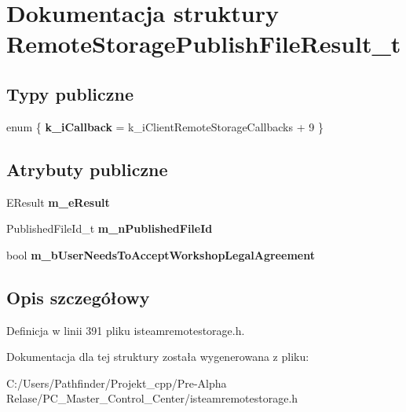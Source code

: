 \hypertarget{struct_remote_storage_publish_file_result__t}{}\section{Dokumentacja struktury Remote\+Storage\+Publish\+File\+Result\+\_\+t}
\label{struct_remote_storage_publish_file_result__t}
\subsection*{Typy publiczne}
\begin{DoxyCompactItemize}
\item 
\mbox{\label{struct_remote_storage_publish_file_result__t_abed55568a305e9a891c09f5b1ff54334}} 
enum \{ {\bfseries k\+\_\+i\+Callback} = k\+\_\+i\+Client\+Remote\+Storage\+Callbacks + 9
 \}
\end{DoxyCompactItemize}
\subsection*{Atrybuty publiczne}
\begin{DoxyCompactItemize}
\item 
\mbox{\label{struct_remote_storage_publish_file_result__t_a950adaf0881518a732f13d98da26d114}} 
E\+Result {\bfseries m\+\_\+e\+Result}
\item 
\mbox{\label{struct_remote_storage_publish_file_result__t_ac12c949583750f11396aca171309667e}} 
Published\+File\+Id\+\_\+t {\bfseries m\+\_\+n\+Published\+File\+Id}
\item 
\mbox{\label{struct_remote_storage_publish_file_result__t_a306faf18fefc438bc96c9c4b0b2a38f4}} 
bool {\bfseries m\+\_\+b\+User\+Needs\+To\+Accept\+Workshop\+Legal\+Agreement}
\end{DoxyCompactItemize}


\subsection{Opis szczegółowy}


Definicja w linii 391 pliku isteamremotestorage.\+h.



Dokumentacja dla tej struktury została wygenerowana z pliku\+:\begin{DoxyCompactItemize}
\item 
C\+:/\+Users/\+Pathfinder/\+Projekt\+\_\+cpp/\+Pre-\/\+Alpha Relase/\+P\+C\+\_\+\+Master\+\_\+\+Control\+\_\+\+Center/isteamremotestorage.\+h\end{DoxyCompactItemize}

